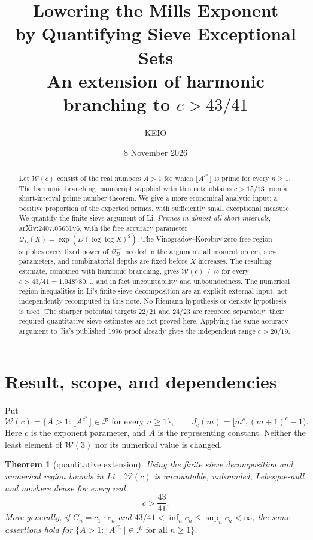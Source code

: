 \documentclass[11pt,a4paper]{article}
\title{\bfseries Lowering the Mills Exponent\\by Quantifying Sieve Exceptional Sets\\[6pt]
\large\normalfont An extension of harmonic branching to $c>43/41$}
\author{KEIO}
\date{8 November 2026}
\newtheorem{theorem}{Theorem}[section]
\theoremstyle{remark}
\newcommand{\PP}{\mathcal P}
\newcommand{\W}{\mathcal W}
\newcommand{\Q}{\mathcal Q}
\begin{document}
\maketitle
\begin{abstract}
Let $\W(c)$ consist of the real numbers $A>1$ for which
$\lfloor A^{c^n}\rfloor$ is prime for every $n\ge1$.
The harmonic branching manuscript supplied with this note obtains
$c>15/13$ from a short-interval prime number theorem.
We give a more economical analytic input: a positive proportion of the
expected primes, with sufficiently small exceptional measure.
We quantify the finite sieve argument of Li,
\emph{Primes in almost all short intervals}, arXiv:2407.05651v6,
with the free accuracy parameter
$\Q_D(X)=\exp(D(\log\log X)^2)$.
The Vinogradov--Korobov zero-free region supplies every fixed power of
$\Q_D^{-1}$ needed in the argument; all moment orders, sieve parameters,
and combinatorial depths are fixed before $X$ increases.
The resulting estimate, combined with harmonic branching, gives
$\W(c)\ne\varnothing$ for every $c>43/41=1.048780\ldots$,
and in fact uncountability and unboundedness.
The numerical region inequalities in Li's finite sieve decomposition are
an explicit external input, not independently recomputed in this note.
No Riemann hypothesis or density hypothesis is used.
The sharper potential targets $22/21$ and $24/23$ are recorded separately:
their required quantitative sieve estimates are not proved here.
Applying the same accuracy argument to Jia's published 1996 proof
already gives the independent range $c>20/19$.
\end{abstract}

\section{Result, scope, and dependencies}

Put
\[
 \W(c)=\{A>1:\lfloor A^{c^n}\rfloor\in\PP\text{ for every }n\ge1\},
 \qquad
 J_c(m)=[m^c,(m+1)^c-1).
\]
Here $c$ is the exponent parameter, and $A$ is the representing constant.
Neither the least element of $\W(3)$ nor its numerical value is changed.

\begin{theorem}[quantitative extension]\label{thm:main}
Using the finite sieve decomposition and numerical region bounds in
Li~\cite{LiI}, $\W(c)$ is uncountable, unbounded, Lebesgue-null and nowhere
dense for every real
\[
                       \boxed{c>\frac{43}{41}}.
\]
More generally, if $C_n=c_1\cdots c_n$ and
$43/41<\inf_n c_n\le\sup_n c_n<\infty$, the same assertions hold for
$\{A>1:\lfloor A^{C_n}\rfloor\in\PP\text{ for all }n\ge1\}$.
\end{theorem}
\end{document}
